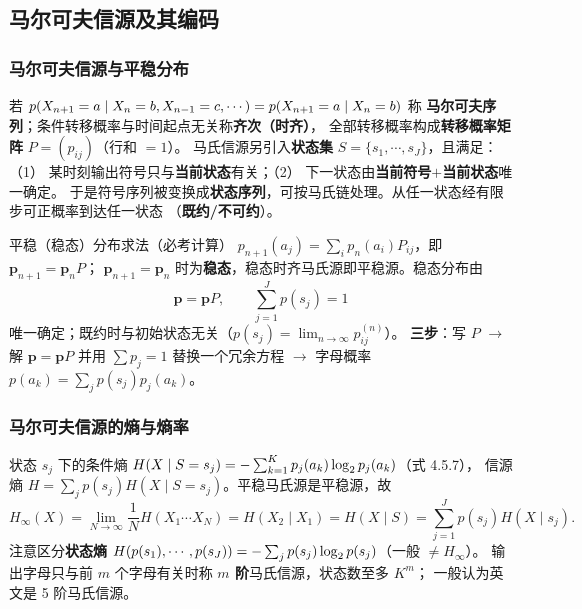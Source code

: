 \subsection{马尔可夫信源及其编码}

\subsubsection{马尔可夫信源与平稳分布}
若 $p\!\left(X_{n+1}=a\mid X_n=b,X_{n-1}=c,\cdots\right)=p\!\left(X_{n+1}=a\mid X_n=b\right)$ 称
\textbf{马尔可夫序列}；条件转移概率与时间起点无关称\textbf{齐次（时齐）}，
全部转移概率构成\textbf{转移概率矩阵} $P=(p_{ij})$（行和 $=1$）。
马氏信源另引入\textbf{状态集} $S=\{s_1,\cdots,s_J\}$，且满足：
（1） 某时刻输出符号只与\textbf{当前状态}有关；（2） 下一状态由\textbf{当前符号$+$当前状态}唯一确定。
于是符号序列被变换成\textbf{状态序列}，可按马氏链处理。从任一状态经有限步可正概率到达任一状态
（\textbf{既约/不可约}）。

\begin{defbox}{平稳（稳态）分布求法（必考计算）}
$p_{n+1}(a_j)=\sum_ip_n(a_i)P_{ij}$，即 $\boldsymbol p_{n+1}=\boldsymbol p_nP$；
$\boldsymbol p_{n+1}=\boldsymbol p_n$ 时为\textbf{稳态}，稳态时齐马氏源即平稳源。稳态分布由
\begin{equation}
\boldsymbol p=\boldsymbol pP,\qquad\sum_{j=1}^{J}p(s_j)=1
\tag{4.5.5}
\end{equation}
唯一确定；既约时与初始状态无关（$p(s_j)=\lim_{n\to\infty}p_{ij}^{(n)}$）。
\textbf{三步}：写 $P$ $\to$ 解 $\boldsymbol p=\boldsymbol pP$ 并用 $\sum p_j=1$ 替换一个冗余方程
$\to$ 字母概率 $p(a_k)=\sum_jp(s_j)p_j(a_k)$。
\end{defbox}

\subsubsection{马尔可夫信源的熵与熵率}
状态 $s_j$ 下的条件熵 $H(X\mid S=s_j)=-\sum_{k=1}^{K}p_j(a_k)\log_{2} p_j(a_k)$（式 4.5.7），
信源熵 $H=\sum_jp(s_j)H(X\mid S=s_j)$。平稳马氏源是平稳源，故
\begin{equation}
H_\infty(X)=\lim_{N\to\infty}\frac1NH(X_1\cdots X_N)
=H(X_2\mid X_1)=H(X\mid S)=\sum_{j=1}^{J}p(s_j)H(X\mid s_j).
\tag{4.5.10}
\end{equation}
注意区分\textbf{状态熵} $H(p(s_1),\cdots,p(s_J))=-\sum_jp(s_j)\log_{2} p(s_j)$（一般 $\ne H_\infty$）。
输出字母只与前 $m$ 个字母有关时称 \textbf{$m$ 阶}马氏信源，状态数至多 $K^{m}$；
一般认为英文是 5 阶马氏信源。

